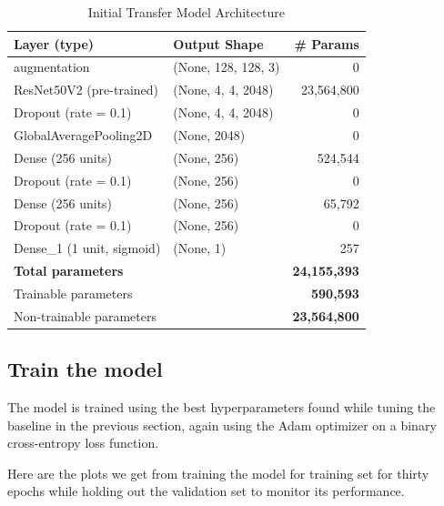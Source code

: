 \documentclass[conference]{IEEEtran}
\begin{document}
\begin{table}[htbp]
	\caption{Initial Transfer Model Architecture}
	\label{table:transfer_cnn_overview}
	\centering
	\begin{adjustbox}{width=0.48\textwidth}
		\begin{tabular}{|l|l|r|}
			\hline
			\textbf{Layer (type)} & \textbf{Output Shape} & \textbf{\# Params} \\
			\hline
			augmentation                   & (None, 128, 128, 3)    &      0  \\
			ResNet50V2 (pre-trained)       & (None, 4, 4, 2048)     & 23,564,800\\
			Dropout (rate = 0.1)           & (None, 4, 4, 2048)     &      0  \\
			GlobalAveragePooling2D         & (None, 2048)           &      0  \\
			Dense (256 units)              & (None, 256)            & 524,544\\
			Dropout (rate = 0.1)           & (None, 256)            &      0  \\
			Dense (256 units)              & (None, 256)            & 65,792\\
			Dropout (rate = 0.1)           & (None, 256)            &      0  \\
			Dense\_1 (1 unit, sigmoid)     & (None, 1)              &     257 \\
			\hline
			\multicolumn{2}{|l|}{\textbf{Total parameters}} & \textbf{24,155,393} \\
			\multicolumn{2}{|l|}{Trainable parameters}       & \textbf{590,593} \\
			\multicolumn{2}{|l|}{Non‑trainable parameters}   & \textbf{23,564,800}\\
			\hline
		\end{tabular}
	\end{adjustbox}
\end{table}

\subsection{Train the model}
The model is trained using the best hyperparameters found while tuning the baseline in the previous section, again using the Adam optimizer on a binary cross-entropy loss function.

Here are the plots we get from training the model for training set for thirty epochs while holding out the validation set to monitor its performance.
\end{document}
